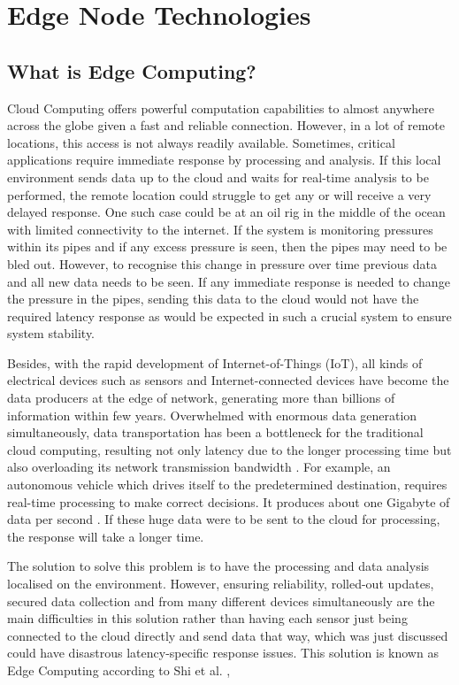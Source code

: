 
\section{Edge Node Technologies}
\label{edge_node_technologies}
\subsection{What is Edge Computing?}

Cloud Computing offers powerful computation capabilities to almost anywhere across the globe given a fast and reliable connection. However, in a lot of remote locations, this access is not always readily available. Sometimes, critical applications require immediate response by processing and analysis. If this local environment sends data up to the cloud and waits for real-time analysis to be performed, the remote location could struggle to get any or will receive a very delayed response. One such case could be at an oil rig in the middle of the ocean with limited connectivity to the internet. If the system is monitoring pressures within its pipes and if any excess pressure is seen, then the pipes may need to be bled out. However, to recognise this change in pressure over time previous data and all new data needs to be seen. If any immediate response is needed to change the pressure in the pipes, sending this data to the cloud would not have the required latency response as would be expected in such a crucial system to ensure system stability.

Besides, with the rapid development of Internet-of-Things (IoT), all kinds of electrical devices such as sensors and Internet-connected devices have become the data producers at the edge of network, generating more than billions of information within few years. Overwhelmed with enormous data generation simultaneously, data transportation has been a bottleneck for the traditional cloud computing, resulting not only latency due to the longer processing time but also overloading its network transmission bandwidth \cite{lei_roy_xiaoming_stefano_zbigniew_hannes_2013}. For example, an autonomous vehicle which drives itself to the predetermined destination, requires real-time processing to make correct decisions. It produces about one Gigabyte of data per second \cite{mark_2013}. If these huge data were to be sent to the cloud for processing, the response will take a longer time.

The solution to solve this problem is to have the processing and data analysis localised on the environment. However, ensuring reliability, rolled-out updates, secured data collection and from many different devices simultaneously are the main difficulties in this solution rather than having each sensor just being connected to the cloud directly and send data that way, which was just discussed could have disastrous latency-specific response issues. This solution is known as Edge Computing according to Shi et al. \cite{w_h_q_w_2017}, 

